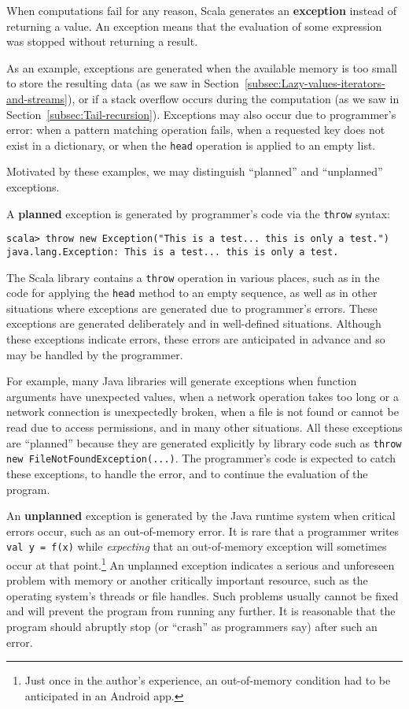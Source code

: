When computations fail for any reason, Scala generates an \textbf{exception}
instead of returning a value. An exception means that the evaluation
of some expression was stopped without returning a result.

As an example, exceptions are generated when the available memory
is too small to store the resulting data (as we saw in Section~\ref{subsec:Lazy-values-iterators-and-streams}),
or if a stack overflow occurs during the computation (as we saw in
Section~\ref{subsec:Tail-recursion}). Exceptions may also occur
due to programmer\textsf{'}s error: when a pattern matching operation fails,
when a requested key does not exist in a dictionary, or when the \lstinline!head!
operation is applied to an empty list.

Motivated by these examples, we may distinguish \textsf{``}planned\textsf{''}
and \textsf{``}unplanned\textsf{''} exceptions. 

A \textbf{planned} exception is generated by programmer\textsf{'}s code via
the \lstinline!throw! syntax:
\begin{lstlisting}
scala> throw new Exception("This is a test... this is only a test.")
java.lang.Exception: This is a test... this is only a test.
\end{lstlisting}
The Scala library contains a \lstinline!throw! operation in various
places, such as in the code for applying the \lstinline!head! method
to an empty sequence, as well as in other situations where exceptions
are generated due to programmer\textsf{'}s errors. These exceptions are generated
deliberately and in well-defined situations. Although these exceptions
indicate errors, these errors are anticipated in advance and so may
be handled by the programmer.

For example, many Java libraries will generate exceptions when function
arguments have unexpected values, when a network operation takes too
long or a network connection is unexpectedly broken, when a file is
not found or cannot be read due to access permissions, and in many
other situations. All these exceptions are \textsf{``}planned\textsf{''} because they
are generated explicitly by library code such as \lstinline!throw new FileNotFoundException(...)!.
The programmer\textsf{'}s code is expected to catch these exceptions, to handle
the error, and to continue the evaluation of the program.

An \textbf{unplanned} exception is generated
by the Java runtime system when critical errors occur, such as an
out-of-memory error. It is rare that a programmer writes \lstinline!val y = f(x)!
while \emph{expecting} that an out-of-memory exception will sometimes
occur at that point.\footnote{Just once in the author\textsf{'}s experience, an out-of-memory condition had
to be anticipated in an Android app.} An unplanned exception indicates a serious and unforeseen problem
with memory or another critically important resource, such as the
operating system\textsf{'}s threads or file handles. Such problems usually
cannot be fixed and will prevent the program from running any further.
It is reasonable that the program should abruptly stop (or \textsf{``}crash\textsf{''}
as programmers say) after such an error.

